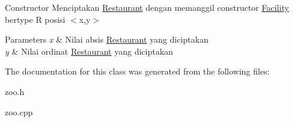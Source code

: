 Constructor Menciptakan \hyperlink{classRestaurant}{Restaurant} dengan memanggil constructor \hyperlink{classFacility}{Facility} bertype \textquotesingle{}R\textquotesingle{} posisi $<$x,y$>$ 


\begin{DoxyParams}{Parameters}
{\em x} & Nilai absis \hyperlink{classRestaurant}{Restaurant} yang diciptakan \\
\hline
{\em y} & Nilai ordinat \hyperlink{classRestaurant}{Restaurant} yang diciptakan \\
\hline
\end{DoxyParams}


The documentation for this class was generated from the following files\+:\begin{DoxyCompactItemize}
\item 
zoo.\+h\item 
zoo.\+cpp\end{DoxyCompactItemize}
